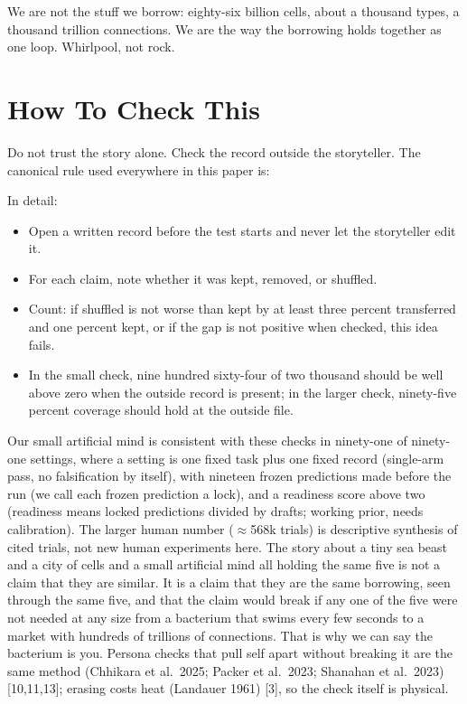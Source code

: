 \documentclass[11pt,a4paper]{article}
\begin{document}
We are not the stuff we borrow: eighty-six billion cells, about a thousand types, a thousand trillion connections. We are the way the borrowing holds together as one loop. Whirlpool, not rock.

\section{How To Check This}

Do not trust the story alone. Check the record outside the storyteller. The canonical rule used everywhere in this paper is:

\noindent{}

In detail:

\begin{itemize}
\item Open a written record before the test starts and never let the storyteller edit it.
\item For each claim, note whether it was kept, removed, or shuffled.
\item Count: if shuffled is not worse than kept by at least three percent transferred and one percent kept, or if the gap is not positive when checked, this idea fails.
\item In the small check, nine hundred sixty-four of two thousand should be well above zero when the outside record is present; in the larger check, ninety-five percent coverage should hold at the outside file.
\end{itemize}

Our small artificial mind is consistent with these checks in ninety-one of ninety-one settings, where a setting is one fixed task plus one fixed record (single-arm pass, no falsification by itself), with nineteen frozen predictions made before the run (we call each frozen prediction a lock), and a readiness score above two (readiness means locked predictions divided by drafts; working prior, needs calibration). The larger human number ($\approx$568k trials) is descriptive synthesis of cited trials, not new human experiments here. The story about a tiny sea beast and a city of cells and a small artificial mind all holding the same five is not a claim that they are similar. It is a claim that they are the same borrowing, seen through the same five, and that the claim would break if any one of the five were not needed at any size from a bacterium that swims every few seconds to a market with hundreds of trillions of connections. That is why we can say the bacterium is you. Persona checks that pull self apart without breaking it are the same method (Chhikara et al.\ 2025; Packer et al.\ 2023; Shanahan et al.\ 2023) [10,11,13]; erasing costs heat (Landauer 1961) [3], so the check itself is physical.
\end{document}
